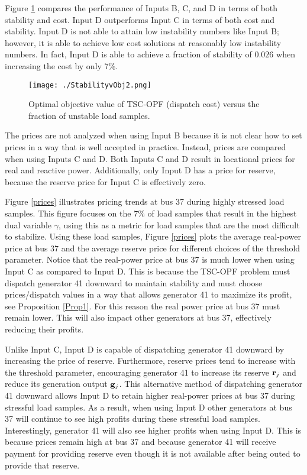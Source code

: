 \documentclass[lettersize,journal]{IEEEtran}
\begin{document}
Figure \ref{fig:ObjStability} compares the performance of Inputs B, C, and D in terms of both stability and cost.  Input D outperforms Input C in terms of both cost and stability.  Input D is not able to attain low instability numbers like Input B; however, it is able to achieve low cost solutions at reasonably low instability numbers. In fact, Input D is able to achieve a fraction of stability of $0.026$ when increasing the cost by only 7\%.

\begin{figure}[h!]
    \centering
    \texttt{[image: ./StabilityvObj2.png]}
    \caption{Optimal objective value of TSC-OPF (dispatch cost) versus the fraction of unstable load samples.}
    \label{fig:ObjStability}
\end{figure}

The prices are not analyzed when using Input B because it is not clear how to set prices in a way that is well accepted in practice.  Instead, prices are compared when using Inputs C and D.  Both Inputs C and D result in locational prices for real and reactive power.  Additionally, only Input D has a price for reserve, because the reserve price for Input C is effectively zero.  

Figure \ref{prices} illustrates pricing trends at bus 37 during highly stressed load samples.  This figure focuses on the 7\% of load samples that result in the highest dual variable $\gamma$, using this as a metric for load samples that are the most difficult to stabilize.  Using these load samples, Figure \ref{prices} plots the average real-power price at bus 37 and the average reserve price for different choices of the threshold parameter.  Notice that the real-power price at bus 37 is much lower when using Input C as compared to Input D. This is because the TSC-OPF problem must dispatch generator 41 downward to maintain stability and must choose prices/dispatch values in a way that allows generator 41 to maximize its profit, see Proposition \ref{Prop1}.  For this reason the real power price at bus 37 must remain lower.  This will also impact other generators at bus 37, effectively reducing their profits.

Unlike Input C, Input D is capable of dispatching generator 41 downward by increasing the price of reserve. Furthermore, reserve prices tend to increase with the threshold parameter, encouraging generator 41 to increase its reserve $\bold{r}_j$ and reduce its generation output $\bold{g}_j$.  This alternative method of dispatching generator 41 downward allows Input D to retain higher real-power prices at bus 37 during stressful load samples.  As a result, when using Input D other generators at bus 37 will continue to see high profits during these stressful load samples.  Interestingly, generator 41 will also see higher profits when using Input D.  This is because prices remain high at bus 37 and because generator 41 will receive payment for providing reserve even though it is not available after being outed to provide that reserve.
\end{document}
